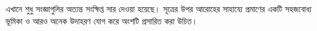 \documentclass[../../../include/open-logic-chapter]{subfiles}
\begin{document}

\begin{editorial}
  এখানে শুধু সংজ্ঞাগুলির অত্যন্ত সংক্ষিপ্ত সার দেওয়া হয়েছে। সূত্রের উপর
  আরোহের সাহায্যে প্রমাণের একটি সহজবোধ্য ভূমিকা ও আরও অনেক উদাহরণ যোগ করে
  অংশটি প্রসারিত করা উচিত।
\end{editorial}







\OLEndChapterHook
\end{document}
